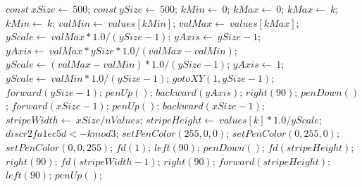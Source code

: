 \documentclass[a4paper,10pt]{article}
\begin{document}
\begin{algorithm}
\caption{drawBarChart(values, nValues)}
\begin{algorithmic}[5]

\STATE {}
\STATE {}
\STATE {}
\STATE {}
  \STATE \(const\ xSize\gets\ 500\);
  \STATE \(const\ ySize\gets\ 500\);
  \STATE \(kMin\gets\ 0\);
  \STATE \(kMax\gets\ 0\);
      \STATE \(kMax\gets\ k\);
    \ELSE
        \STATE \(kMin\gets\ k\);
      \ENDIF
    \ENDIF
  \ENDFOR
  \STATE \(valMin\gets\ values[kMin]\);
  \STATE \(valMax\gets\ values[kMax]\);
  \STATE \(yScale\gets\ valMax*1.0/(ySize-1)\);
  \STATE \(yAxis\gets\ ySize-1\);
      \STATE \(yAxis\gets\ valMax*ySize*1.0/(valMax-valMin)\);
      \STATE \(yScale\gets(valMax-valMin)*1.0/(ySize-1)\);
    \ELSE
      \STATE \(yAxis\gets\ 1\);
      \STATE \(yScale\gets\ valMin*1.0/(ySize-1)\);
    \ENDIF
  \ENDIF
  \STATE \(gotoXY(1,ySize-1)\);
  \STATE \(forward(ySize-1)\);
  \STATE \(penUp()\);
  \STATE \(backward(yAxis)\);
  \STATE \(right(90)\);
  \STATE \(penDown()\);
  \STATE \(forward(xSize-1)\);
  \STATE \(penUp()\);
  \STATE \(backward(xSize-1)\);
  \STATE \(stripeWidth\gets\ xSize/nValues\);
    \STATE \(stripeHeight\gets\ values[k]*1.0/yScale\);
    \STATE \(discr2fa1ec5d <- k mod 3\);
      \STATE \(setPenColor(255,0,0)\);
      \STATE \(setPenColor(0,255,0)\);
      \STATE \(setPenColor(0,0,255)\);
    \ENDIF
    \STATE \(fd(1)\);
    \STATE \(left(90)\);
    \STATE \(penDown()\);
    \STATE \(fd(stripeHeight)\);
    \STATE \(right(90)\);
    \STATE \(fd(stripeWidth-1)\);
    \STATE \(right(90)\);
    \STATE \(forward(stripeHeight)\);
    \STATE \(left(90)\);
    \STATE \(penUp()\);
  \ENDFOR

\end{algorithmic}
\end{algorithm}
\end{document}
